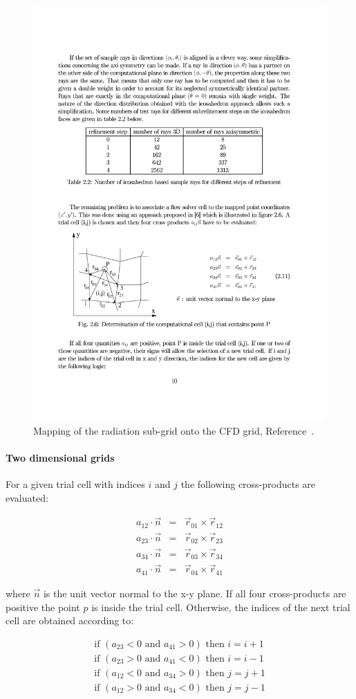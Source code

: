 \begin{figure}[h]
 \centering
 \includegraphics[width=0.5\linewidth]{radiation/figures/cell_searching.pdf}
 \caption{Mapping of the radiation sub-grid onto the CFD grid, Reference~\cite{karl2001}.}
 \label{fig:cell-searching}
\end{figure}

\paragraph{Two dimensional grids}

For a given trial cell with indices $i$ and $j$ the following cross-products are evaluated:

\begin{eqnarray}
  a_{12} \cdot \vec{n} &=& \vec{r}_{01} \times \vec{r}_{12} \\
  a_{23} \cdot \vec{n} &=& \vec{r}_{02} \times \vec{r}_{23} \\
  a_{34} \cdot \vec{n} &=& \vec{r}_{03} \times \vec{r}_{34} \\
  a_{41} \cdot \vec{n} &=& \vec{r}_{04} \times \vec{r}_{41}
\end{eqnarray}

\noindent where $\vec{n}$ is the unit vector normal to the x-y plane.
If all four cross-products are positive the point $p$ is inside the trial cell.
Otherwise, the indices of the next trial cell are obtained according to:

\begin{eqnarray}
 \text{if } \left ( a_{23} < 0 \text{ and } a_{41} > 0 \right ) \text{ then } i = i + 1 \\ 
 \text{if } \left ( a_{23} > 0 \text{ and } a_{41} < 0 \right ) \text{ then } i = i - 1 \\
 \text{if } \left ( a_{12} < 0 \text{ and } a_{34} > 0 \right ) \text{ then } j = j + 1 \\
 \text{if } \left ( a_{12} > 0 \text{ and } a_{34} < 0 \right ) \text{ then } j = j - 1 
\end{eqnarray}

